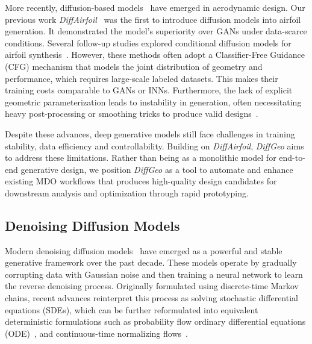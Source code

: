 More recently, diffusion-based models~\cite{ai.Ho2020} have emerged in aerodynamic design. Our previous work \textit{DiffAirfoil}~\cite{aa.Wei2024} was the first to introduce diffusion models into airfoil generation. It demonstrated the model's superiority over GANs under data-scarce conditions. Several follow-up studies explored conditional diffusion models for airfoil synthesis~\cite{aa.Graves2024,aa.Yonekura2024,aa.Wagenaar2024,aa.Yang2024}. However, these methods often adopt a Classifier-Free Guidance (CFG) mechanism that models the joint distribution of geometry and performance, which requires large-scale labeled datasets. This makes their training costs comparable to GANs or INNs. Furthermore, the lack of explicit geometric parameterization leads to instability in generation, often necessitating heavy post-processing or smoothing tricks to produce valid designs~\cite{aa.Graves2024,aa.Yonekura2024}.

Despite these advances, deep generative models still face challenges in training stability, data efficiency and controllability. Building on \textit{DiffAirfoil}, \textit{DiffGeo} aims to address these limitations. Rather than being as a monolithic model for end-to-end generative design, we position \textit{DiffGeo} as a tool to automate and enhance existing MDO workflows that produces high-quality design candidates for downstream analysis and optimization through rapid prototyping.

\subsection{Denoising Diffusion Models}

Modern denoising diffusion models~\cite{ai.SohlDickstein2015,ai.Ho2020,ai.Song2021c} have emerged as a powerful and stable generative framework over the past decade. These models operate by gradually corrupting data with Gaussian noise and then training a neural network to learn the reverse denoising process. Originally formulated using discrete-time Markov chains, recent advances reinterpret this process as solving stochastic differential equations (SDEs), which can be further reformulated into equivalent deterministic formulations such as probability flow ordinary differential equations (ODE)~\cite{ai.Song2021c,ai.Karras2022}, and continuous-time normalizing flows~\cite{ai.Lipman2022,ai.Liu2023f,ai.Albergo2023}.

